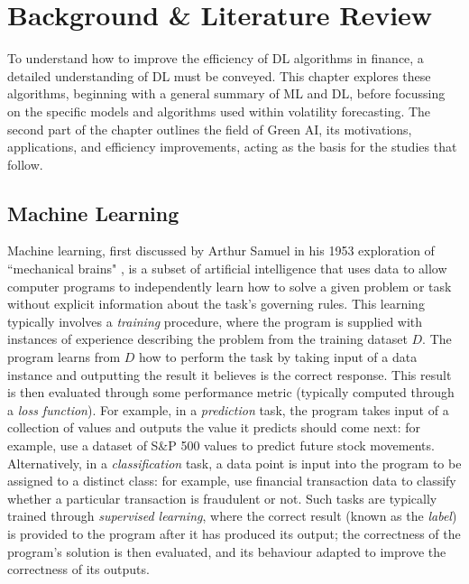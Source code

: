 \documentclass[a4paper, 11pt]{report}
\begin{document}
    \newpage
    \chapter{Background \& Literature Review}
    \label{chapter: literature}

    To understand how to improve the efficiency of DL algorithms in finance, a detailed understanding of DL must be conveyed. This chapter explores these algorithms, beginning with a general summary of ML and DL, before focussing on the specific models and algorithms used within volatility forecasting. The second part of the chapter outlines the field of Green AI, its motivations, applications, and efficiency improvements, acting as the basis for the studies that follow.


    \section{Machine Learning}

    Machine learning, first discussed by Arthur Samuel in his 1953 exploration of ``mechanical brains" \citep{samuel-1959}, is a subset of artificial intelligence that uses data to allow computer programs to independently learn how to solve a given problem or task without explicit information about the task's governing rules. This learning typically involves a \emph{training} procedure, where the program is supplied with instances of experience describing the problem from the training dataset $D$. The program learns from $D$ how to perform the  task by taking input of a data instance and outputting the result it believes is the correct response. This result is then evaluated through some performance metric (typically computed through a \emph{loss function}). For example, in a \emph{prediction} task, the program takes input of a collection of values and outputs the value it predicts should come next: for example, \citet{xiong-2015} use a dataset of S\&P 500 values to predict future stock movements. Alternatively, in a \emph{classification} task, a data point is input into the program to be assigned to a distinct class: for example, \citet{sadgali-2019} use financial transaction data to classify whether a particular transaction is fraudulent or not. Such tasks are typically trained through \emph{supervised learning}, where the correct result (known as the \emph{label}) is provided to the program after it has produced its output; the correctness of the program's solution is then evaluated, and its behaviour adapted to improve the correctness of its outputs.
\end{document}
